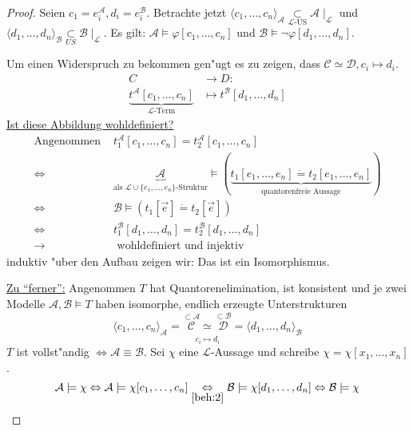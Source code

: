 \documentclass[a4paper,12pt,numbers=noenddot,parskip=full]{scrartcl}
\newcommand{\scrL}{\mathcal{L}}
\newcommand{\scrA}{\mathcal{A}}
\newcommand{\scrB}{\mathcal{B}}
\newcommand{\scrC}{\mathcal{C}}
\newcommand{\scrD}{\mathcal{D}}
\theoremstyle{dotless}
\theoremstyle{remark}
\begin{document}
\begin{proof}
	Seien $c_1=e^\scrA_i, d_i=e^\scrB_i$. Betrachte jetzt $\langle c_1, \dots, c_n \rangle_\scrA \underset{\scrL \text{-US}}{\subset} \scrA \mid_\scrL$ und $\langle d_1, \dots, d_n \rangle_\scrB \underset{US}{\subset} \scrB \mid_\scrL$. Es gilt: $\scrA \models \varphi[c_1, \dots, c_n]$ und $\scrB \models \lnot \varphi[d_1, \dots, d_n]$.
	
	Um einen Widerspruch zu bekommen gen"ugt es zu zeigen, dass $\scrC \simeq \scrD, c_i \mapsto d_i$.
	\begin{align*}
		C &\longrightarrow D:\\
		\underbrace{t^\scrA[c_1, \dots, c_n]}_{\scrL \text{-Term}} &\mapsto t^\scrB[d_1, \dots, d_n]
	\end{align*}
	\underline{Ist diese Abbildung wohldefiniert?}
	\begin{align*}
		\text{Angenommen } &t_1^\scrA[c_1, \dots, c_n] = t_2^\scrA[c_1, \dots, c_n]\\
		\Leftrightarrow &\underbrace{\scrA}_{\text{als } \scrL \cup \{e_1, \dots, e_n \} \text{-Struktur}} \models (\underbrace{t_1[e_1, \dots, e_n] \dot= t_2[e_1, \dots, e_n]}_{\text{quantorenfreie Aussage}})\\
		\Leftrightarrow &\scrB \models (t_1[\vec{e}] \dot= t_2[\vec{e}])\\
		\Leftrightarrow &t_1^\scrB[d_1, \dots, d_n] = t_2^\scrB[d_1, \dots, d_n]\\
		\longrightarrow &\text{ wohldefiniert und injektiv}
	\end{align*}
	induktiv "uber den Aufbau zeigen wir: Das ist ein Isomorphismus.
	
	\underline{Zu "`ferner"':} Angenommen $T$ hat Quantorenelimination, ist konsistent und je zwei Modelle $\scrA, \scrB \models T$ haben isomorphe, endlich erzeugte Unterstrukturen
	\begin{equation*}
		\underset{c_i \mapsto d_i}{\langle c_1, \dots, c_n \rangle_\scrA = \overset{\subset \scrA}{\scrC} \simeq \overset{\subset \scrB}{\scrD} = \langle d_1, \dots, d_n \rangle_\scrB}
	\end{equation*}
	$T$ ist vollst"andig $\Leftrightarrow \scrA \equiv \scrB$.
	Sei $\chi$ eine $\scrL$-Aussage und schreibe $\chi = \chi[x_1, \dots, x_n]$.
	\begin{equation*}
		\scrA \models \chi \Leftrightarrow \scrA \models \chi[c_1, \dots, c_n] \underset{\ref{beh:2}}{\Leftrightarrow} \scrB \models \chi[d_1, \dots, d_n] \Leftrightarrow \scrB \models \chi
	\end{equation*}
\end{proof}
\end{document}
